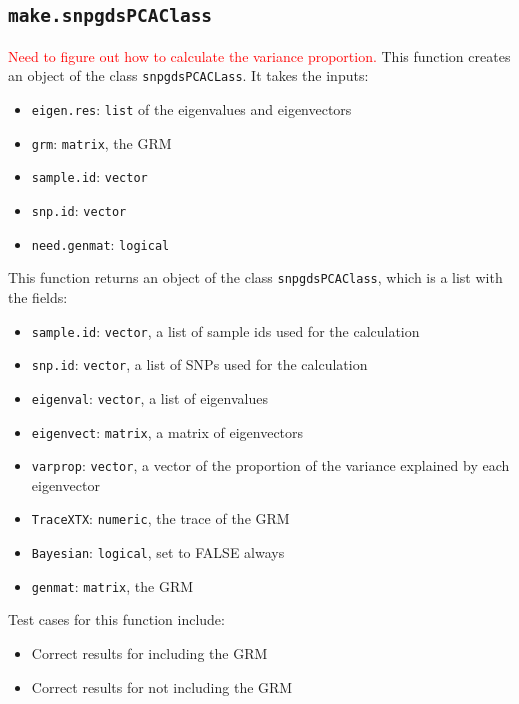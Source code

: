 \documentclass[11pt]{article}
\newcommand{\note}[1]{{\sf\textcolor{red}{#1}}}
\begin{document}
\subsection{\texttt{make.snpgdsPCAClass}}
\note{Need to figure out how to calculate the variance proportion.}
This function creates an object of the class \texttt{snpgdsPCACLass}. It takes the inputs:
\begin{itemize}
	\item \texttt{eigen.res}: \texttt{list} of the eigenvalues and eigenvectors
	\item \texttt{grm}: \texttt{matrix}, the GRM
	\item \texttt{sample.id}: \texttt{vector}
	\item \texttt{snp.id}: \texttt{vector}
	\item \texttt{need.genmat}: \texttt{logical}
\end{itemize}
This function returns an object of the class \texttt{snpgdsPCAClass}, which is a list with the fields:
\begin{itemize}
	\item \texttt{sample.id}: \texttt{vector}, a list of sample ids used for the calculation
	\item \texttt{snp.id}: \texttt{vector}, a list of SNPs used for the calculation
	\item \texttt{eigenval}: \texttt{vector}, a list of eigenvalues
	\item \texttt{eigenvect}: \texttt{matrix}, a matrix of eigenvectors
	\item \texttt{varprop}: \texttt{vector}, a vector of the proportion of the variance explained by each eigenvector
	\item \texttt{TraceXTX}: \texttt{numeric}, the trace of the GRM
	\item \texttt{Bayesian}: \texttt{logical}, set to FALSE always
	\item \texttt{genmat}: \texttt{matrix}, the GRM
\end{itemize}
Test cases for this function include:
\begin{itemize}
	\item Correct results for including the GRM
	\item Correct results for not including the GRM
\end{itemize}
\end{document}
